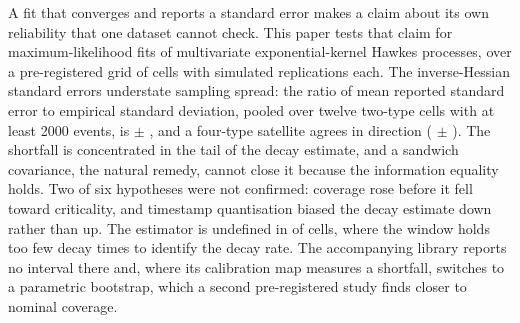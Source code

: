 A fit that converges and reports a standard error makes a claim about its own
reliability that one dataset cannot check. This paper tests that claim for
maximum-likelihood fits of multivariate exponential-kernel Hawkes processes, over a
pre-registered grid of \HsixCells{} cells with \HsixReplications{} simulated
replications each. The inverse-Hessian standard errors understate sampling spread:
the ratio of mean reported standard error to empirical standard deviation, pooled
over twelve two-type cells with at least 2000 events, is \HsixQ{} $\pm$ \HsixQSe{},
and a four-type satellite agrees in direction (\HsixSatQ{} $\pm$ \HsixSatSe{}). The
shortfall is concentrated in the tail of the decay estimate, and a sandwich
covariance, the natural remedy, cannot close it because the information equality
holds. Two of six hypotheses were not confirmed: coverage rose before it fell toward
criticality, and timestamp quantisation biased the decay estimate down rather than
up. The estimator is undefined in \HsixUndefined{} of \HsixCells{} cells, where the
window holds too few decay times to identify the decay rate. The accompanying
library reports no interval there and, where its calibration map measures a
shortfall, switches to a parametric bootstrap, which a second pre-registered study
finds closer to nominal coverage.
